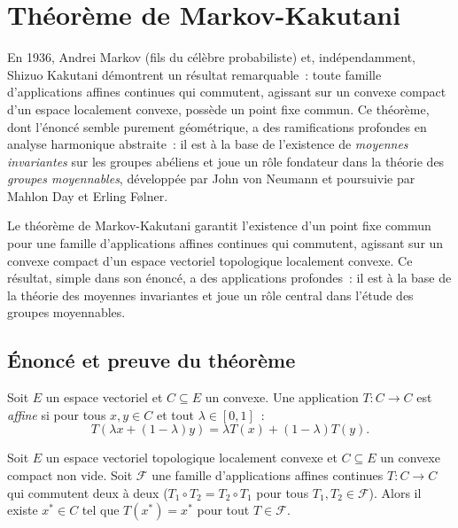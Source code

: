 \chapter{Th\'eor\`eme de Markov-Kakutani}
\label{ch:markov_kakutani}

En 1936, Andrei Markov (fils du c\'el\`ebre probabiliste) et, ind\'ependamment, Shizuo Kakutani d\'emontrent un r\'esultat remarquable~: toute famille d'applications affines continues qui commutent, agissant sur un convexe compact d'un espace localement convexe, poss\`ede un point fixe commun. Ce th\'eor\`eme, dont l'\'enonc\'e semble purement g\'eom\'etrique, a des ramifications profondes en analyse harmonique abstraite~: il est \`a la base de l'existence de \emph{moyennes invariantes} sur les groupes ab\'eliens et joue un r\^ole fondateur dans la th\'eorie des \emph{groupes moyennables}, d\'evelopp\'ee par John von Neumann et poursuivie par Mahlon Day et Erling F\o lner.

\begin{intuition}
Le th\'eor\`eme de Markov-Kakutani garantit l'existence d'un point fixe commun pour une
famille d'applications affines continues qui commutent, agissant sur un convexe compact
d'un espace vectoriel topologique localement convexe. Ce r\'esultat, simple dans son
\'enonc\'e, a des applications profondes~: il est \`a la base de la th\'eorie des moyennes
invariantes et joue un r\^ole central dans l'\'etude des groupes moyennables.
\end{intuition}

\section{\'Enonc\'e et preuve du th\'eor\`eme}

\begin{definition}
Soit $E$ un espace vectoriel et $C \subseteq E$ un convexe. Une application $T\colon C \to C$
est \emph{affine} si pour tous $x, y \in C$ et tout $\lambda \in [0,1]$~:
\[
  T(\lambda x + (1-\lambda)y) = \lambda T(x) + (1-\lambda) T(y).
\]
\end{definition}

\begin{theoreme}
\label{thm:markov-kakutani}
Soit $E$ un espace vectoriel topologique localement convexe et $C \subseteq E$ un convexe
compact non vide. Soit $\mathcal{F}$ une famille d'applications affines continues
$T\colon C \to C$ qui commutent deux \`a deux ($T_1 \circ T_2 = T_2 \circ T_1$ pour tous
$T_1, T_2 \in \mathcal{F}$). Alors il existe $x^* \in C$ tel que $T(x^*) = x^*$ pour
tout $T \in \mathcal{F}$.
\end{theoreme}

